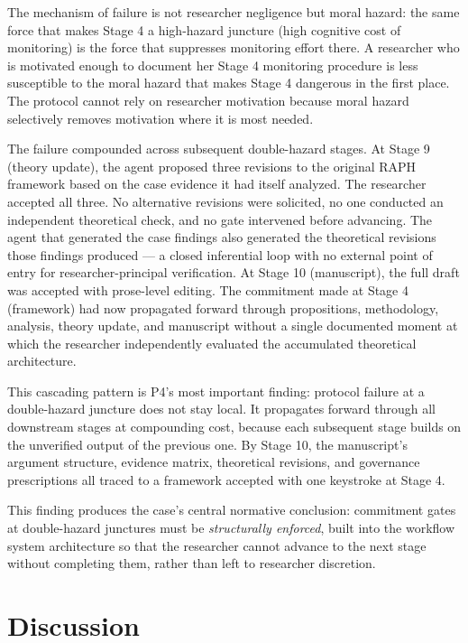 \documentclass[12pt]{article}
\begin{document}
The mechanism of failure is not researcher negligence but moral hazard: the same force
that makes Stage 4 a high-hazard juncture (high cognitive cost of monitoring) is the force
that suppresses monitoring effort there. A researcher who is motivated enough to document
her Stage 4 monitoring procedure is less susceptible to the moral hazard that makes Stage 4
dangerous in the first place. The protocol cannot rely on researcher motivation because
moral hazard selectively removes motivation where it is most needed.

The failure compounded across subsequent double-hazard stages. At Stage 9 (theory update),
the agent proposed three revisions to the original RAPH framework based on the case evidence
it had itself analyzed. The researcher accepted all three. No alternative revisions were
solicited, no one conducted an independent theoretical check, and no gate intervened before
advancing. The agent that generated the case findings also generated the theoretical
revisions those findings produced --- a closed inferential loop with no external point of
entry for researcher-principal verification. At Stage 10 (manuscript), the full draft was
accepted with prose-level editing. The commitment made at Stage 4 (framework) had now
propagated forward through propositions, methodology, analysis, theory update, and
manuscript without a single documented moment at which the researcher independently
evaluated the accumulated theoretical architecture.

This cascading pattern is P4's most important finding: protocol failure at a double-hazard
juncture does not stay local. It propagates forward through all downstream stages at
compounding cost, because each subsequent stage builds on the unverified output of the
previous one. By Stage 10, the manuscript's argument structure, evidence matrix, theoretical
revisions, and governance prescriptions all traced to a framework accepted with one
keystroke at Stage 4.

This finding produces the case's central normative conclusion: commitment gates at
double-hazard junctures must be \emph{structurally enforced}, built into the workflow
system architecture so that the researcher cannot advance to the next stage without
completing them, rather than left to researcher discretion.

\section{Discussion}
\end{document}
